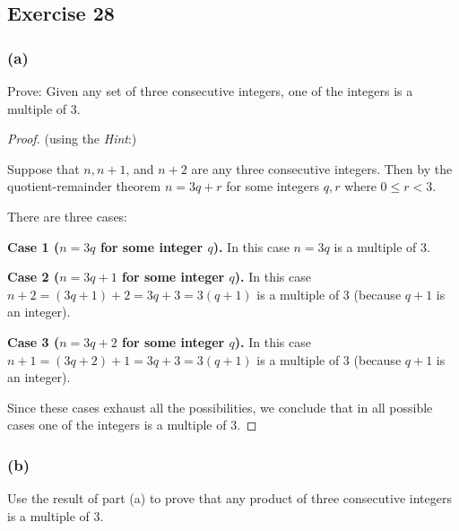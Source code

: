 \documentclass[14pt]{extarticle}
\begin{document}
\subsection{Exercise 28}

\subsubsection{(a)}
Prove: Given any set of three consecutive integers, one of the integers is a multiple of 3.

\begin{proof}
    (using the {\it Hint}:)

    Suppose that $n, n + 1$, and $n + 2$ are any three consecutive integers. Then by the quotient-remainder theorem $n = 3q+r$ for some integers $q,r$ where $0 \leq r < 3$.

    There are three cases:

    {\bf Case 1 ($n = 3q$ for some integer $q$).} In this case $n = 3q$ is a multiple of 3.

        {\bf Case 2 ($n = 3q + 1$ for some integer $q$).} In this case $n + 2 = (3q+1)+2 = 3q+3 = 3(q+1)$ is a multiple of 3 (because $q+1$ is an integer).

        {\bf Case 3 ($n = 3q + 2$ for some integer $q$).} In this case $n + 1 = (3q + 2) + 1 = 3q+3 = 3(q+1)$ is a multiple of 3 (because $q+1$ is an integer).

    Since these cases exhaust all the possibilities, we conclude that in all possible cases one of the integers is a multiple of 3.
\end{proof}

\subsubsection{(b)}
Use the result of part (a) to prove that any product of three consecutive integers is a multiple of 3.
\end{document}
